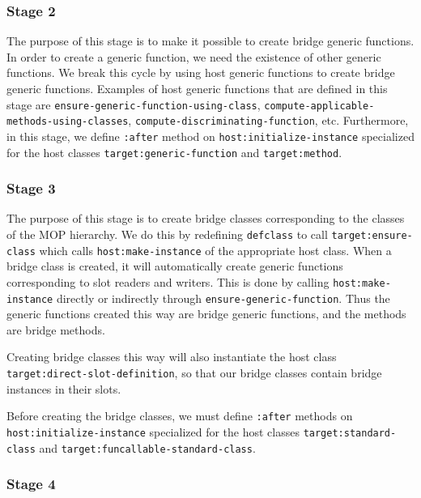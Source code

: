 \subsubsection{Stage 2}

The purpose of this stage is to make it possible to create bridge
generic functions.  In order to create a generic function, we need the
existence of other generic functions.  We break this cycle by using
host generic functions to create bridge generic functions.  Examples 
of host generic functions that are defined in this stage are
\texttt{ensure-generic-function-using-class},
\texttt{compute-applicable-methods-using-classes},
\texttt{compute-discriminating-function}, etc.  Furthermore, in this
stage, we define \texttt{:after} method on
\texttt{host:initialize-instance} specialized for the host classes
\texttt{target:generic-function} and \texttt{target:method}.  

\subsubsection{Stage 3}

The purpose of this stage is to create bridge classes corresponding to
the classes of the MOP hierarchy.  We do this by redefining
\texttt{defclass} to call \texttt{target:ensure-class} which calls
\texttt{host:make-instance} of the appropriate host class.  When a
bridge class is created, it will automatically create generic
functions corresponding to slot readers and writers.  This is done by
calling \texttt{host:make-instance} directly or indirectly through
\texttt{ensure-generic-function}.  Thus the generic functions created
this way are bridge generic functions, and the methods are bridge
methods.

Creating bridge classes this way will also instantiate the host class
\texttt{target:direct-slot-definition}, so that our bridge classes
contain bridge instances in their slots. 

Before creating the bridge classes, we must define \texttt{:after}
methods on \texttt{host:initialize-instance} specialized for the host
classes \texttt{target:standard-class} and
\texttt{target:funcallable-standard-class}.  

\subsubsection{Stage 4}

